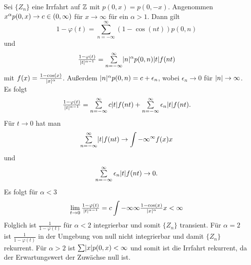 \documentclass{cheat-sheet}
\begin{document}
\begin{bsp}
  Sei $\{ Z_n \}$ eine Irrfahrt auf $\mathbb{Z}$ mit $p(0, x) = p(0, -x)$.
  Angenommen $x^\alpha p(0, x) \to c \in \left( 0, \infty \right)$ für $x \to \infty$ für ein $\alpha > 1$.
  Dann gilt
  \[ 1 - \varphi(t) = \sum_{n=-\infty}^\infty (1 - \cos(nt)) p(0, n) \]
  und
  \[
    \tfrac{1 - \varphi(t)}{\abs{t}^{\alpha - 1}} = \sum_{n=-\infty}^\infty \abs{n}^\alpha p(0, n) \abs{t} f(n t)
  \]
  mit $f(x) = \tfrac{1 - \cos(x)}{\lvert x\rvert^\alpha}$.
  Außerdem $\lvert n\rvert^\alpha p(0, n) = c + \epsilon_n$, wobei $\epsilon_n \to 0$ für $\lvert n\rvert \to \infty$.
  Es folgt
  \[
    \tfrac{1 - \varphi(t)}{\abs{t}^{\alpha - 1}} = \sum_{n=-\infty}^\infty c \abs{t} f(n t) + \sum_{n=-\infty}^\infty \epsilon_n \abs{t} f(n t).
  \]
  Für $t \to 0$ hat man
  \[ \sum_{n=-\infty}^\infty \abs{t} f(n t) \to \int{-\infty}^{\infty}{f(x)}{x} \]
  und
  \[ \sum_{n=-\infty}^\infty \epsilon_n \abs{t} f(n t) \to 0. \]
  Es folgt für $\alpha < 3$
  \[ \lim_{t \to 0} \tfrac{1 - \varphi(t)}{\lvert t\rvert^{\alpha - 1}} = c \int{-\infty}{\infty}{\tfrac{1 - \cos(x)}{\lvert x\rvert^\alpha}}{x} < \infty \]
  Folglich ist $\tfrac{1}{1 - \varphi(t)}$ für $\alpha < 2$ integrierbar und somit $\{ Z_n \}$ transient.
  Für $\alpha = 2$ ist $\tfrac{1}{1 - \varphi(t)}$ in der Umgebung von null nicht integrierbar und damit $\{ Z_n \}$ rekurrent.
  Für $\alpha > 2$ ist $\sum \abs{x} p(0, x) < \infty$ und somit ist die Irrfahrt rekurrent, da der Erwartungswert der Zuwächse null ist.
\end{bsp}
\end{document}
